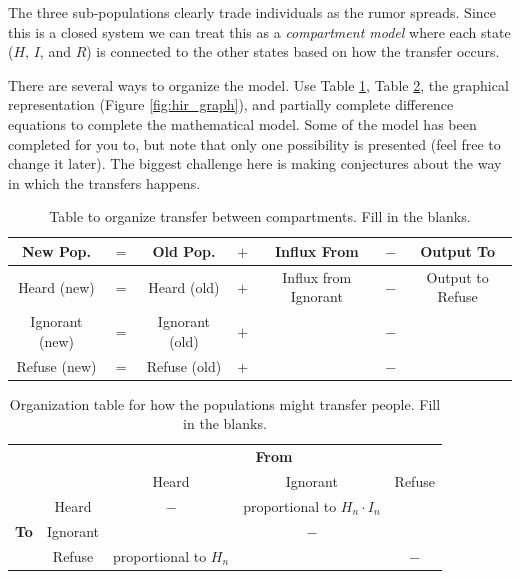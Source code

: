 \begin{problem}
The three sub-populations clearly trade individuals as the rumor spreads.  Since
    this is a closed system we can treat this as a {\it compartment model} where each
    state ($H$, $I$, and $R$) is connected to the other states based on how the
    transfer occurs. 

    There are several ways to organize the model.  Use Table \ref{tab:hir_table}, Table
    \ref{tab:hir_transfer}, the graphical
    representation (Figure \ref{fig:hir_graph}), and partially complete difference equations to complete the
    mathematical model. Some of the model has been completed for you to, but note that
    only one possibility is presented (feel free to change it later). The biggest
    challenge here is making conjectures about the way in which the transfers happens.

\end{problem}

        \begin{table}[ht!]
            \centering
            \begin{tabular}{|c|c|c|c|c|c|c|}
                \hline
                {\bf New Pop.} & $=$ & {\bf Old Pop.} & $+$ & {\bf Influx From} & $-$ &
                {\bf Output To} \\ \hline \hline
                Heard (new) & $=$ & Heard (old) & $+$ & Influx from Ignorant & $-$ &
                Output to Refuse \\ \hline
                Ignorant (new) & $=$ & Ignorant (old) & $+$ &  & $-$ &
                 \\ \hline
                Refuse (new) & $=$ & Refuse (old) & $+$ &   & $-$ &
                 \\ \hline
            \end{tabular}
            \caption{Table to organize transfer between compartments. Fill in the blanks.}
            \label{tab:hir_table}
        \end{table}


        \begin{table}[ht!]
            \centering
            \begin{tabular}{cc|ccc}
                & & \multicolumn{3}{|c}{{\bf From}} \\
                & & Heard & Ignorant & Refuse \\ \hline 
                \multirow{3}{*}{{\bf To}} & Heard & $-$ & proportional to $H_n \cdot I_n$
                &  \underline{\hspace{1in}} \\ 
                & Ignorant & \underline{\hspace{1in}} & $-$ & \underline{\hspace{1in}} \\
                & Refuse & proportional to $H_n$  & \underline{\hspace{1in}}  & $-$ \\ 
            \end{tabular}
            \caption{Organization table for how the populations might transfer people. Fill in the blanks.}
            \label{tab:hir_transfer}
        \end{table}


